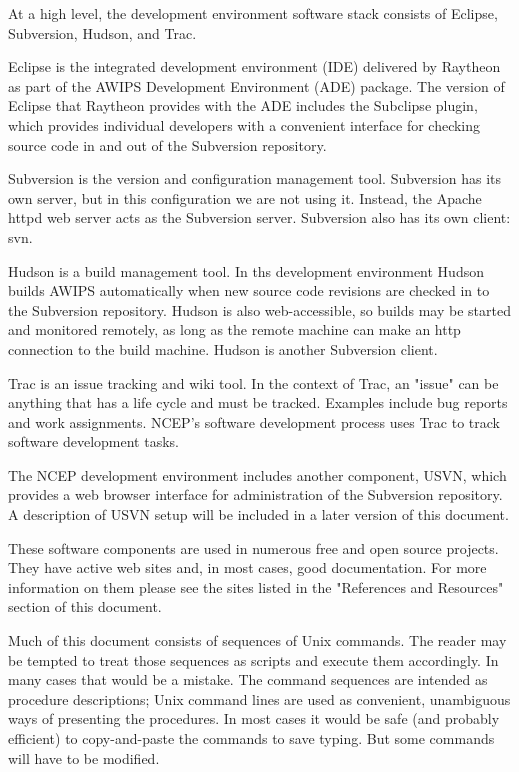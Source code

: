 At a high level, the development environment software stack consists of
Eclipse, Subversion, Hudson, and Trac.

Eclipse is the integrated development environment (IDE) delivered by
Raytheon as part of the AWIPS Development Environment (ADE) package.
The version of Eclipse that Raytheon provides with the ADE includes
the Subclipse plugin, which provides individual developers with
a convenient interface for checking source code in and out of the
Subversion repository.

Subversion is the version and configuration management tool.  Subversion
has its own server, but in this configuration we are not using it.
Instead, the Apache httpd web server acts as the Subversion server.
Subversion also has its own client: svn.  

Hudson is a build management tool.  In ths development environment
Hudson builds AWIPS automatically when new source code revisions are
checked in to the Subversion repository.  Hudson is also web-accessible,
so builds may be started and monitored remotely, as long as the remote
machine can make an http connection to the build machine.  Hudson is
another Subversion client.

Trac is an issue tracking and wiki tool.  In the context of Trac, an
"issue" can be anything that has a life cycle and must be tracked.
Examples include bug reports and work assignments.  NCEP's software
development process uses Trac to track software development tasks.

The NCEP development environment includes another component, USVN, which
provides a web browser interface for administration of the Subversion
repository.  A description of USVN setup will be included in  a later
version of this document.

These software components are used in numerous free and open
source projects.  They have active web sites and, in most cases, good
documentation.  For more information on them please see the sites listed
in the "References and Resources" section of this document.

Much of this document consists of sequences of Unix commands.  The reader
may be tempted to treat those sequences as scripts and execute them
accordingly.  In many cases that would be a mistake.  The command
sequences are intended as procedure descriptions; Unix command lines
are used as convenient, unambiguous ways of presenting the procedures.
In most cases it would be safe (and probably efficient) to copy-and-paste
the commands to save typing.  But some commands will have to be modified.

